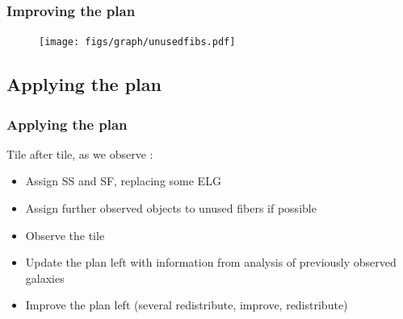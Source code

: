 \documentclass{beamer}
\begin{document}
\begin{frame}\frametitle{Improving the plan}
	\begin{figure}[H]
		\hspace*{-0.5cm}
		\texttt{[image: figs/graph/unusedfibs.pdf]}
	\end{figure}
\end{frame}


\subsection{Applying the plan}
\begin{frame}\frametitle{Applying the plan}
	Tile after tile, as we observe :
	\begin{itemize}
		\item Assign SS and SF, replacing some ELG
		\item Assign further observed objects to unused fibers if possible
		\item Observe the tile
		\item Update the plan left with information from analysis of previously observed galaxies
		\item Improve the plan left (several redistribute, improve, redistribute)
	\end{itemize}
\end{frame}
\end{document}
